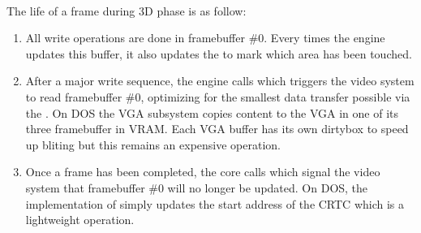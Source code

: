 \par
 \\
\par
\vspace{5pt}
\pagebreak
\par
The life of a frame during 3D phase is as follow:
\begin{enumerate}
\item All write operations are done in framebuffer \#0. Every times the engine updates this buffer, it also updates the  to mark which area has been touched.
\item After a major write sequence, the engine calls  which triggers the video system to read framebuffer \#0, optimizing for the smallest data transfer possible via the . On DOS the VGA subsystem copies content to the VGA in one of its three framebuffer in VRAM. Each VGA buffer has its own dirtybox  to speed up bliting but this remains an expensive operation.

\item Once a frame has been completed, the core calls   which signal the video system that framebuffer \#0 will no longer be updated. On DOS, the implementation of  simply updates the start address of the CRTC which is a lightweight operation.
\end{enumerate}
\par
{}\\
